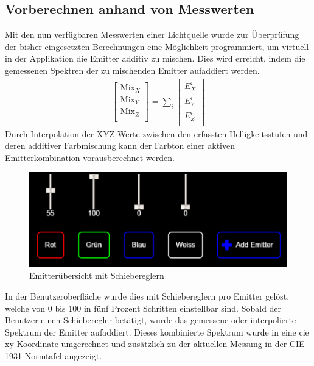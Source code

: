 \documentclass[11pt]{scrartcl}
\begin{document}
\subsection{Vorberechnen anhand von Messwerten}\label{calcColor}
Mit den nun verfügbaren Messwerten einer Lichtquelle wurde zur Überprüfung der bisher eingesetzten Berechnungen eine Möglichkeit programmiert,
um virtuell in der Applikation die Emitter additiv zu mischen. Dies wird erreicht, indem die gemessenen Spektren der zu mischenden Emitter aufaddiert werden.
\begin{align}\label{Equ:22}
    \left[ \begin{array}{r}
        \text{Mix}_X \\
        \text{Mix}_Y \\
        \text{Mix}_Z \\
    \end{array}\right]
    = \sum_{i} \left[ \begin{array}{r}
        E^i_X \\
        E^i_Y \\
        E^i_Z \\
    \end{array}\right]
\end{align}
Durch Interpolation der XYZ Werte zwischen den erfassten Helligkeitsstufen und deren additiver Farbmischung kann der Farbton einer aktiven Emitterkombination
vorausberechnet werden.
\begin{figure}[H]
    \begin{center}
        \includegraphics[width=.9\textwidth]{images/app_emitters_with_sliders_v1.png}
    \end{center}
    \caption{Emitterübersicht mit Schiebereglern}\label{fig:emitterFaders}
\end{figure}
\noindent
In der Benutzeroberfläche wurde dies mit Schiebereglern pro Emitter gelöst, welche von 0 bis 100 in fünf Prozent Schritten einstellbar sind.
Sobald der Benutzer einen Schieberegler betätigt, wurde das gemessene oder interpolierte Spektrum der Emitter aufaddiert. Dieses kombinierte
Spektrum wurde in eine \ac{cie} xy Koordinate umgerechnet und zusätzlich zu der aktuellen Messung in der CIE 1931 Normtafel angezeigt.
\end{document}
